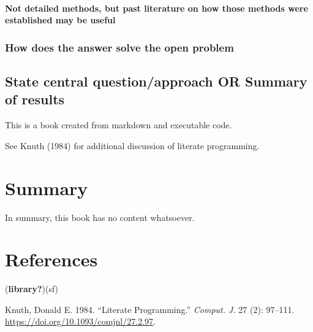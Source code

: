 \documentclass[
  letterpaper,
  DIV=11,
  numbers=noendperiod]{scrreprt}
\newlength{\cslhangindent}
\newenvironment{CSLReferences}[2] %
 {\begin{list}{}{%
  \setlength{\itemindent}{0pt}
  \setlength{\leftmargin}{0pt}
  \setlength{\parsep}{0pt}
  \ifodd #1
   \setlength{\leftmargin}{\cslhangindent}
   \setlength{\itemindent}{-1\cslhangindent}
  \fi
  \setlength{\itemsep}{#2\baselineskip}}}
 {\end{list}}
\begin{document}
\subsubsection{Not detailed methods, but past literature on how those
methods were established may be
useful}\label{not-detailed-methods-but-past-literature-on-how-those-methods-were-established-may-be-useful}

\subsection{How does the answer solve the open
problem}\label{how-does-the-answer-solve-the-open-problem}

\section{State central question/approach OR Summary of
results}\label{state-central-questionapproach-or-summary-of-results}

This is a book created from markdown and executable code.

See Knuth (1984) for additional discussion of literate programming.


\chapter{Summary}\label{summary}

In summary, this book has no content whatsoever.


\chapter*{References}\label{references}


\label{refs}
\begin{CSLReferences}{1}{0}
(\textbf{library?})(sf)

Knuth, Donald E. 1984. {``Literate Programming.''} \emph{Comput. J.} 27
(2): 97--111. \url{https://doi.org/10.1093/comjnl/27.2.97}.

\end{CSLReferences}

\cleardoublepage
{}
{}
\appendix
\end{document}
